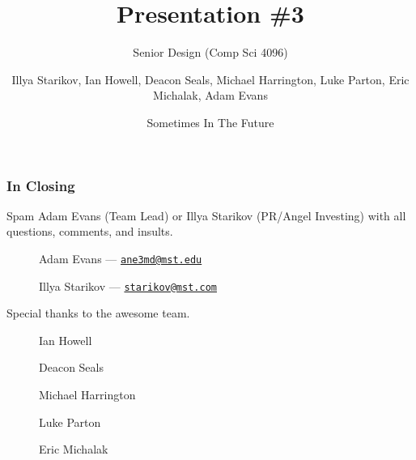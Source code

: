 \documentclass[handout,xclolor=dvipsnames]{beamer}    %
\title{Presentation \#3}
\subtitle{Senior Design (Comp Sci 4096)}
\author{Illya Starikov, Ian Howell, Deacon Seals, Michael Harrington, Luke Parton, Eric Michalak, Adam Evans}
\date{Sometimes In The Future}
\institute{Missouri University of Science and Technology}
\begin{document}
\begin{darkframes}
    \maketitle


    \begin{frame}
        \frametitle{In Closing}

        Spam Adam Evans (Team Lead) or Illya Starikov (PR/Angel Investing) with all questions, comments, and insults.

        \begin{center}
            \begin{description}
                \item[\faComment] Adam Evans --- \href{mailto:ane3md@mst.edu}{\nolinkurl{ane3md@mst.edu}}
                \item[\faComment] Illya Starikov --- \href{mailto:starikov@mst.edu}{\nolinkurl{starikov@mst.com}}
            \end{description}
        \end{center}

        Special thanks to the awesome team.

        \begin{center}
            \begin{description}
                \item[\faUser] Ian Howell
                \item[\faUser] Deacon Seals
                \item[\faUser] Michael Harrington
                \item[\faUser] Luke Parton
                \item[\faUser] Eric Michalak
            \end{description}
        \end{center}
    \end{frame}
\end{darkframes}
\end{document}
